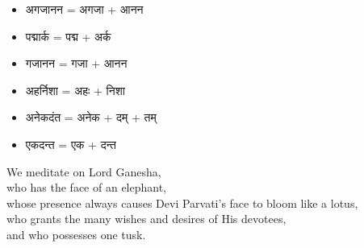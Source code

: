 \documentclass{book}
\begin{document}
\begin{multicols}{2}
    \setlength{\columnseprule}{0.4pt}
    \begin{itemize}
        \item अगजानन = अगजा + आनन
        \item पद्मार्क = पद्म + अर्क
        \item गजानन = गजा + आनन
        \item अहर्निशा = अहः + निशा
        \item अनेकदंत = अनेक + दम्  + तम्
        \item एकदन्त = एक + दन्त
    \end{itemize}

    \columnbreak
    
    \vspace{10pt}
    \textenglish{
        \noindent We meditate on Lord Ganesha,\\
        who has the face of an elephant,\\
        whose presence always causes Devi Parvati's face to bloom like a lotus,\\
        who grants the many wishes and desires of His devotees,\\
        and who possesses one tusk.
    }

\end{multicols}
\end{document}
